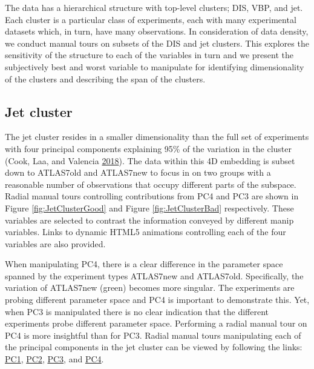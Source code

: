 The data has a hierarchical structure with top-level clusters; DIS, VBP,
and jet. Each cluster is a particular class of experiments, each with
many experimental datasets which, in turn, have many observations. In
consideration of data density, we conduct manual tours on subsets of the
DIS and jet clusters. This explores the sensitivity of the structure to
each of the variables in turn and we present the subjectively best and
worst variable to manipulate for identifying dimensionality of the
clusters and describing the span of the clusters.

\hypertarget{jet-cluster}{%
\subsection{Jet cluster}\label{jet-cluster}}

The jet cluster resides in a smaller dimensionality than the full set of
experiments with four principal components explaining 95\% of the
variation in the cluster (Cook, Laa, and Valencia
\protect\hyperlink{ref-cook_dynamical_2018}{2018}). The data within this
4D embedding is subset down to ATLAS7old and ATLAS7new to focus in on
two groups with a reasonable number of observations that occupy
different parts of the subspace. Radial manual tours controlling
contributions from PC4 and PC3 are shown in Figure
\ref{fig:JetClusterGood} and Figure \ref{fig:JetClusterBad}
respectively. These variables are selected to contrast the information
conveyed by different manip variables. Links to dynamic HTML5 animations
controlling each of the four variables are also provided.

When manipulating PC4, there is a clear difference in the parameter
space spanned by the experiment types ATLAS7new and ATLAS7old.
Specifically, the variation of ATLAS7new (green) becomes more singular.
The experiments are probing different parameter space and PC4 is
important to demonstrate this. Yet, when PC3 is manipulated there is no
clear indication that the different experiments probe different
parameter space. Performing a radial manual tour on PC4 is more
insightful than for PC3. Radial manual tours manipulating each of the
principal components in the jet cluster can be viewed by following the
links:
\href{https://nspyrison.netlify.com/thesis/jetcluster_manualtour_pc1/}{PC1},
\href{https://nspyrison.netlify.com/thesis/jetcluster_manualtour_pc2/}{PC2},
\href{https://nspyrison.netlify.com/thesis/jetcluster_manualtour_pc3/}{PC3},
and
\href{https://nspyrison.netlify.com/thesis/jetcluster_manualtour_pc4/}{PC4}.

